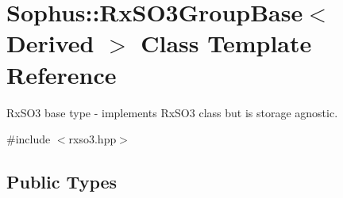 \hypertarget{class_sophus_1_1_rx_s_o3_group_base}{}\section{Sophus\+:\+:Rx\+S\+O3\+Group\+Base$<$ Derived $>$ Class Template Reference}
\label{class_sophus_1_1_rx_s_o3_group_base}


Rx\+S\+O3 base type -\/ implements Rx\+S\+O3 class but is storage agnostic.  




{\ttfamily \#include $<$rxso3.\+hpp$>$}

\subsection*{Public Types}
